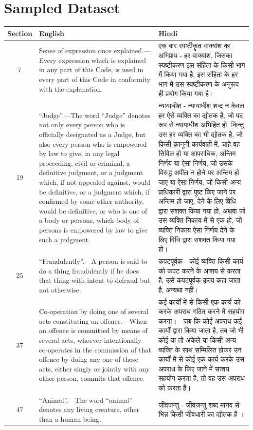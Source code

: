 \section*{Sampled Dataset}
\begin{longtable}{|c|p{6cm}|p{6cm}|}
\hline
\textbf{Section} & \textbf{English} & \textbf{Hindi} \\
\hline
7 & Sense of expression once explained.—Every expression which is explained in any part of this Code, is used in every part of this Code in conformity with the explanation. & {\hindifont एक बार स्पष्टीकॄत वाक्यांश का अभिप्राय - हर वाक्यांश, जिसका स्पष्टीकरण इस संहिता के किसी भाग में किया गया है, इस संहिता के हर भाग में उस स्पष्टीकरण के अनुरूप ही प्रयोग किया गया है।} \\
\hline
19 & “Judge”.—The word “Judge” denotes not only every person who is officially designated as a Judge, but also every person who is empowered by law to give, in any legal proceeding, civil or criminal, a definitive judgment, or a judgment which, if not appealed against, would be definitive, or a judgment which, if confirmed by some other authority, would be definitive, or who is one of a body or persons, which body of persons is empowered by law to give such a judgment. & {\hindifont न्यायाधीश - न्यायाधीश शब्द न केवल हर ऐसे व्यक्ति का द्योतक है, जो पद रूप से न्यायाधीश अभिहित हो, किन्तु उस हर व्यक्ति का भी द्योतक है, जो किसी क़ानूनी कार्यवाही में, चाहे वह सिविल हो या आपराधिक, अन्तिम निर्णय या ऐसा निर्णय, जो उसके विरुद्ध अपील न होने पर अन्तिम हो जाए या ऐसा निर्णय, जो किसी अन्य प्राधिकारी द्वारा पुष्ट किए जाने पर अन्तिम हो जाए, देने के लिए विधि द्वारा सशक्त किया गया हो, अथवा जो उस व्यक्ति निकाय में से एक हो, जो व्यक्ति निकाय ऐसा निर्णय देने के लिए विधि द्वारा सशक्त किया गया हो।} \\
\hline
25 & “Fraudulently”.—A person is said to do a thing fraudulently if he does that thing with intent to defraud but not otherwise. & {\hindifont कपटपूर्वक - कोई व्यक्ति किसी कार्य को कपट करने के आशय से करता है, उसे कपटपूर्वक कृत्य कहा जाता है, अन्यथा नहीं।} \\
\hline
37 & Co-operation by doing one of several acts constituting an offence.—When an offence is committed by means of several acts, whoever intentionally co-operates in the commission of that offence by doing any one of those acts, either singly or jointly with any other person, commits that offence. & {\hindifont कई कार्यों में से किसी एक कार्य को करके अपराध गठित करने में सहयोग करना। - जब कि कोई अपराध कई कार्यों द्वारा किया जाता है, तब जो भी कोई या तो अकेले या किसी अन्य व्यक्ति के साथ सम्मिलित होकर उन कार्यों में से कोई एक कार्य करके उस अपराध के किए जाने में साशय सहयोग करता है, तो वह उस अपराध को करता है।} \\
\hline
47 & “Animal”.—The word “animal” denotes any living creature, other than a human being. & {\hindifont जीवजन्तु - जीवजन्तु शब्द मानव से भिन्न किसी जीवधारी का द्योतक है ।} \\
\hline
\end{longtable}
\doublespacing


